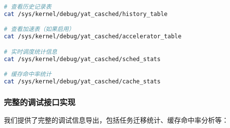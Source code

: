 \begin{tcolorbox} [enhanced, title=\textbf{Debugfs 调试接口}]
\begin{lstlisting}[language=bash, basicstyle=\footnotesize\ttfamily, showstringspaces=false]
# 查看历史记录表
cat /sys/kernel/debug/yat_casched/history_table

# 查看加速表（如果启用）
cat /sys/kernel/debug/yat_casched/accelerator_table

# 实时调度统计信息
cat /sys/kernel/debug/yat_casched/sched_stats

# 缓存命中率统计
cat /sys/kernel/debug/yat_casched/cache_stats
\end{lstlisting}
\end{tcolorbox}

\subsubsection{完整的调试接口实现}

我们提供了完整的调试信息导出，包括任务迁移统计、缓存命中率分析等：

